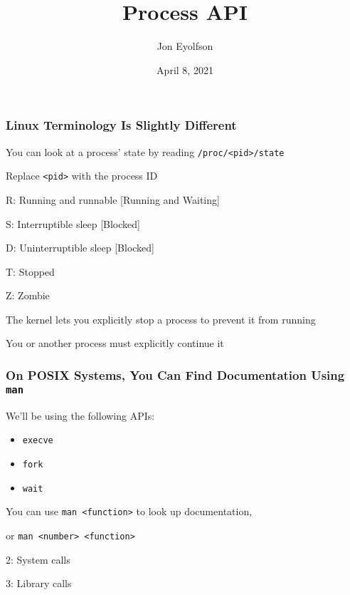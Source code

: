 

\title{Process API}
\author{Jon Eyolfson}
\date{April 8, 2021}


  \begin{frame}
    \titlepage
  \end{frame}

  \begin{frame}
    \frametitle{Linux Terminology Is Slightly Different}

    You can look at a process' state by reading \texttt{/proc/<pid>/state}

    \hspace{2em} Replace \texttt{<pid>} with the process ID

    \vspace{2em}

    R: Running and runnable [Running and Waiting]

    S: Interruptible sleep [Blocked]

    D: Uninterruptible sleep [Blocked]

    T: Stopped

    Z: Zombie

    \vspace{2em}

    The kernel lets you explicitly stop a process to prevent it from running

    \hspace{2em} You or another process must explicitly continue it
  \end{frame}

  \begin{frame}
    \frametitle{On POSIX Systems, You Can Find Documentation Using \texttt{man}}

    We'll be using the following APIs:
    \begin{itemize}
      \item \texttt{execve}
      \item \texttt{fork}
      \item \texttt{wait}
    \end{itemize}

    \vspace{2em}

    You can use \texttt{man <function>} to look up documentation,

    or \texttt{man <number> <function>}

    \hspace{2em} 2: System calls

    \hspace{2em} 3: Library calls
  \end{frame}

